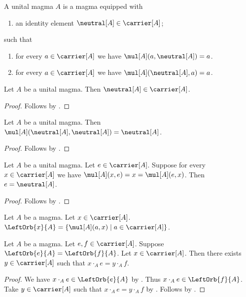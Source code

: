 \begin{struct}\label{unitalmagma}
    A unital magma $A$ is a magma equipped with
    \begin{enumerate}
        \item\label{unitalmagma_type}
            an identity element $\neutral[A]\in\carrier[A]$;
    \end{enumerate}
    such that
    \begin{enumerate}
        \item\label{unitalmagma_right}
            for every $a\in\carrier[A]$ we have
                $\mul[A](a,\neutral[A])=a$.
        \item\label{unitalmagma_left}
            for every $a\in\carrier[A]$ we have
                $\mul[A](\neutral[A],a)=a$.
    \end{enumerate}
\end{struct}

\begin{classification}\label{unitalmagma_neutral_in_carrier}
    Let $A$ be a unital magma.
    Then $\neutral[A]\in\carrier[A]$.
\end{classification}
\begin{proof}
    Follows by .
\end{proof}

\begin{proposition}\label{unitalmagma_mul_neutral_neutral}
    Let $A$ be a unital magma.
    Then $\mul[A](\neutral[A],\neutral[A])=\neutral[A]$.
\end{proposition}
\begin{proof}
    Follows by .
\end{proof}

\begin{proposition}\label{unitalmagma_neutral_unique}
    Let $A$ be a unital magma.
    Let $e\in\carrier[A]$.
    Suppose for every $x\in\carrier[A]$ we have
        $\mul[A](x,e)=x=\mul[A](e,x)$.
    Then $e=\neutral[A]$.
\end{proposition}
\begin{proof}
    Follows by .
\end{proof}

\begin{definition}\label{left_orbit}
    Let $A$ be a magma.
    Let $x\in\carrier[A]$.
    $\LeftOrb{x}{A}=\{\mul[A](a,x)\mid a\in\carrier[A]\}$.
\end{definition}

\begin{proposition}\label{eq_left_orbit_witness}
    Let $A$ be a magma.
    Let $e,f\in\carrier[A]$.
    Suppose $\LeftOrb{e}{A} = \LeftOrb{f}{A}$.
    Let $x\in\carrier[A]$.
    Then there exists $y\in\carrier[A]$ such that
        $x\cdot_{A}e=y\cdot_{A}f$.
\end{proposition}
\begin{proof}
    We have $x\cdot_{A}e\in \LeftOrb{e}{A}$
        by .
    Thus $x\cdot_{A}e\in\LeftOrb{f}{A}$.
    Take $y\in\carrier[A]$ such that
        $x\cdot_{A}e=y\cdot_{A}f$
        by .
    Follows by \auto.
\end{proof}
